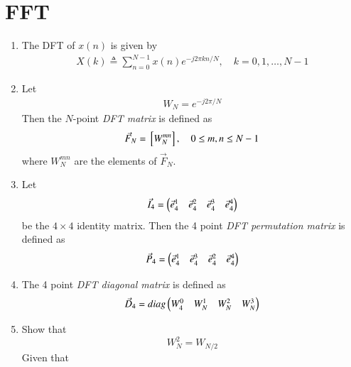 \documentclass[journal,12pt,twocolumn]{IEEEtran}
\renewcommand\thesection{\arabic{section}}
\begin{document}
\section{FFT}
\begin{enumerate}[label=\arabic*.,ref=\thesection.\theenumi]
     \item The DFT of $x(n)$ is given by
           \begin{align}
                X(k) \triangleq \sum_{n=0}^{N-1} x(n) e^{-j 2 \pi k n / N}, \quad k=0,1, \ldots, N-1
           \end{align}
     \item Let
           \begin{align}
                W_{N} = e^{-j2\pi/N}
           \end{align}
           Then the $N$-point {\em DFT matrix} is defined as
           \begin{align}
                \vec{F}_{N} = {}\left[W_{N}^{mn}\right], \quad 0 \le m,n \le N-1
           \end{align}
           where $W_{N}^{mn}$ are the elements of $\vec{F}_{N}$.
     \item Let
           \begin{align}
                \vec{I}_4 = \begin{pmatrix}\vec{e}_4^{1} & \vec{e}_4^{2} & \vec{e}_4^{3} & \vec{e}_4^{4} \end{pmatrix}
           \end{align}
           be the $4\times 4$ identity matrix.  Then the 4 point {\em DFT permutation matrix} is defined as
           \begin{align}
                \vec{P}_4 = \begin{pmatrix}\vec{e}_4^{1} & \vec{e}_4^{3} & \vec{e}_4^{2} & \vec{e}_4^{4} \end{pmatrix}
           \end{align}
     \item The 4 point {\em DFT diagonal matrix} is defined as
           \begin{align}
                \vec{D}_4 = diag\begin{pmatrix}W_{4}^{0} & W_{N}^{1} & W_{N}^{2} & W_{N}^{3}\end{pmatrix}
           \end{align}
     \item Show that
           \begin{equation}
                W_{N}^{2}=W_{N/2} \label{fft-3}
           \end{equation}
           \solution Given that
           \begin{align}

\end{align}
\end{enumerate}
\end{document}
